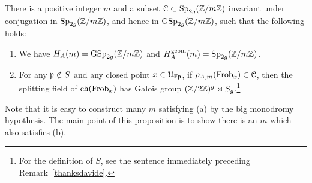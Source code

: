 	\begin{proposition}\label{proposition:good-cover}
		There is a positive integer $m$ and a subset $\mathcal C \subset \operatorname{Sp}_{2g}({\mathbb Z} / m {\mathbb Z})$ invariant under conjugation in $\operatorname{Sp}_{2g}({\mathbb Z} / m {\mathbb Z})$, and hence in $\operatorname{GSp}_{2g}({\mathbb Z} / m {\mathbb Z})$, such that the following holds:
		\begin{enumerate}
			\item We have $H_A(m) = \operatorname{GSp}_{2g}({\mathbb Z} /  m \mathbb Z)$ and $H_A^{\operatorname{geom}}(m) = \operatorname{Sp}_{2g}({\mathbb Z} /  m \mathbb Z)$.
			\item For any $\mathfrak{p} \notin S$ and any closed point $x \in \mathcal{U}_{\mathbb F\mathfrak p}$, if $\rho_{A, m}(\operatorname{Frob}_x) \in \mathcal C$, then the splitting field of $\operatorname{ch}(\operatorname{Frob}_x)$ has Galois group $({\mathbb Z}/2{\mathbb Z})^g \rtimes S_g$.\footnote{For the definition of $S$, see the sentence immediately preceding Remark~\ref{thanksdavide}.}
		\end{enumerate}
	\end{proposition}
Note that it is easy to construct many $m$ satisfying (a) by the big monodromy hypothesis. The main point of this proposition is to show there is an $m$
which also satisfies (b).
